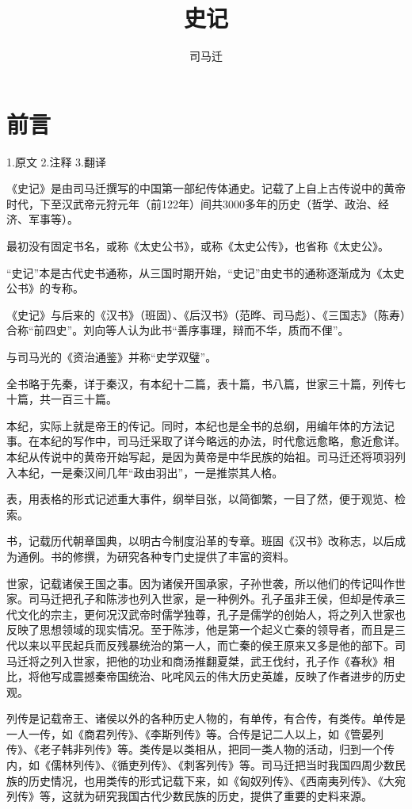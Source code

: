 \documentclass[12pt,UTF8]{ctexbook}
\title{\heiti\zihao{0} 史记}
\author{司马迁}
\date{}
\begin{document}
\maketitle
\tableofcontents

\frontmatter
\chapter{前言}

1.原文
2.注释
3.翻译

《史记》是由司马迁撰写的中国第一部纪传体通史。记载了上自上古传说中的黄帝时代，下至汉武帝元狩元年（前122年）间共3000多年的历史（哲学、政治、经济、军事等）。

最初没有固定书名，或称《太史公书》，或称《太史公传》，也省称《太史公》。

“史记”本是古代史书通称，从三国时期开始，“史记”由史书的通称逐渐成为《太史公书》的专称。

《史记》与后来的《汉书》（班固）、《后汉书》（范晔、司马彪）、《三国志》（陈寿）合称“前四史”。刘向等人认为此书“善序事理，辩而不华，质而不俚”。

与司马光的《资治通鉴》并称“史学双璧”。

全书略于先秦，详于秦汉，有本纪十二篇，表十篇，书八篇，世家三十篇，列传七十篇，共一百三十篇。

本纪，实际上就是帝王的传记。同时，本纪也是全书的总纲，用编年体的方法记事。在本纪的写作中，司马迁采取了详今略远的办法，时代愈远愈略，愈近愈详。本纪从传说中的黄帝开始写起，是因为黄帝是中华民族的始祖。司马迁还将项羽列入本纪，一是秦汉间几年“政由羽出”，一是推崇其人格。

表，用表格的形式记述重大事件，纲举目张，以简御繁，一目了然，便于观览、检索。

书，记载历代朝章国典，以明古今制度沿革的专章。班固《汉书》改称志，以后成为通例。书的修撰，为研究各种专门史提供了丰富的资料。

世家，记载诸侯王国之事。因为诸侯开国承家，子孙世袭，所以他们的传记叫作世家。司马迁把孔子和陈涉也列入世家，是一种例外。孔子虽非王侯，但却是传承三代文化的宗主，更何况汉武帝时儒学独尊，孔子是儒学的创始人，将之列入世家也反映了思想领域的现实情况。至于陈涉，他是第一个起义亡秦的领导者，而且是三代以来以平民起兵而反残暴统治的第一人，而亡秦的侯王原来又多是他的部下。司马迁将之列入世家，把他的功业和商汤推翻夏桀，武王伐纣，孔子作《春秋》相比，将他写成震撼秦帝国统治、叱咤风云的伟大历史英雄，反映了作者进步的历史观。

列传是记载帝王、诸侯以外的各种历史人物的，有单传，有合传，有类传。单传是一人一传，如《商君列传》、《李斯列传》等。合传是记二人以上，如《管晏列传》、《老子韩非列传》等。类传是以类相从，把同一类人物的活动，归到一个传内，如《儒林列传》、《循吏列传》、《刺客列传》等。司马迁把当时我国四周少数民族的历史情况，也用类传的形式记载下来，如《匈奴列传》、《西南夷列传》、《大宛列传》等，这就为研究我国古代少数民族的历史，提供了重要的史料来源。
\end{document}
